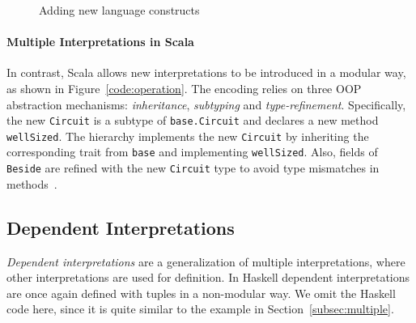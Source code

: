 \begin{figure}
\caption{Adding new language constructs}
\label{code:variant}
\end{figure}

\paragraph{Multiple Interpretations in Scala}
In contrast, Scala allows new interpretations to be introduced in a 
modular way, as shown in Figure~\ref{code:operation}.
The encoding relies on three OOP abstraction mechanisms:
\emph{inheritance}, \emph{subtyping} and \emph{type-refinement}.
Specifically, the new \lstinline{Circuit} is a subtype of
\lstinline{base.Circuit} and declares a new method \lstinline{wellSized}.
The hierarchy implements the new \lstinline{Circuit} by inheriting the corresponding trait from \lstinline{base} and
implementing \lstinline{wellSized}.
Also, fields of \lstinline{Beside} are refined with the new \lstinline{Circuit} type
to avoid type mismatches in methods~\cite{eptrivially16}.


\begin{comment}
We can even define \lstinline{wellSized} independently:
\begin{lstlisting}
trait Circuit { def wellSized: Boolean }
trait Id extends Circuit { ... }
...
\end{lstlisting}
And merge the two hierarchies through \emph{multiple inheritance} for providing
multiple interpretations:
\begin{lstlisting}
trait Circuit
    extends width.Circuit with wellSized.Circuit
trait Id extends Circuit
    with width.Id with wellSized.Circuit
...
\end{lstlisting}
\end{comment}

\subsection{Dependent Interpretations}
 \emph{Dependent interpretations} are a generalization of multiple
interpretations, where other interpretations are used for definition.
In Haskell dependent interpretations are once again defined with
tuples in a non-modular way. We omit the Haskell code here, since 
it is quite similar to the example in Section~\ref{subsec:multiple}.

